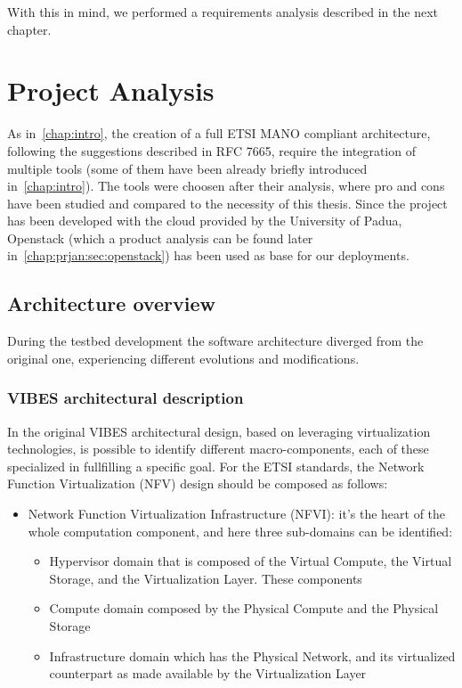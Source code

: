 \documentclass[10pt]{book}
\begin{document}
\noindent With this in mind, we performed a requirements analysis described in 
the next chapter.

\chapter{Project Analysis}
\label{chap:prjan}

As in~\ref{chap:intro}, the creation of a full ETSI MANO compliant
architecture, following the suggestions described in RFC 7665, require the 
integration of multiple tools (some of them have been already briefly 
introduced in~\ref{chap:intro}). The tools were choosen after their 
analysis, where pro and cons have been studied and compared to the necessity of 
this thesis. Since the project has been developed with the cloud provided by 
the University of Padua, Openstack (which a product analysis can be found later 
in~\ref{chap:prjan:sec:openstack}) has been used as base for our deployments.

\section{Architecture overview}

During the testbed development the software architecture diverged from the 
original one, experiencing different evolutions and modifications.

\subsection{VIBES architectural description}

In the original VIBES architectural design, based on leveraging virtualization 
technologies, is possible to identify different macro-components, each of these 
specialized in fullfilling a specific goal. For the ETSI standards, the Network 
Function Virtualization (NFV) design should be composed as follows:
\begin{itemize}
 \item Network Function Virtualization Infrastructure (NFVI): it's the heart of 
the whole computation component, and here three sub-domains can be identified:
\begin{itemize} 
 \item Hypervisor domain that is composed of the Virtual Compute, the Virtual 
Storage, and the Virtualization Layer. These components
 \item Compute domain composed by the Physical Compute and the Physical Storage
 \item Infrastructure domain which has the Physical Network, and its 
virtualized counterpart as made available by the Virtualization Layer
\end{itemize}

\end{itemize}
\end{document}
